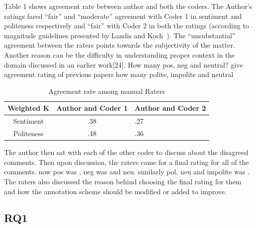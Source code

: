 Table 1 shows agreement rate between author and both the coders. The Author’s ratings fared “fair” and “moderate” agreement with Coder 1 in sentiment and politeness respectively and “fair” with Coder 2 in both the ratings (according to magnitude guidelines presented by Landis and Koch~\cite{landis1977measurement}). The “unsubstantial” agreement between the raters points towards the subjectivity of the matter. Another reason can be the difficulty in understanding proper context in the domain discussed in an earlier work[24].
How many pos, neg and neutral? give agreement rating of previous papers
how many polite, impolite and neutral
\begin{table}
  \caption{Agreement rate among manual Raters}
  \label{tab:freq}
  \begin{tabular}{|c|c|l|}
    \toprule
    Weighted K & Author and Coder 1 &  Author and  Coder 2\\
    \midrule
    Sentiment & .38 & .27 \\
    \hline
    Politeness & .48 & .36\\
  \bottomrule
\end{tabular}
\end{table}

The author then sat with each of the other coder to discuss about the disagreed comments. Then upon discussion, the raters came for a final rating for all of the comments. now pos was , neg was and neu. similarly pol, neu and impolite was . The raters also discussed the reason behind choosing the final rating for them and how the annotation scheme should be modified or added to improve.
\subsection{RQ1}

